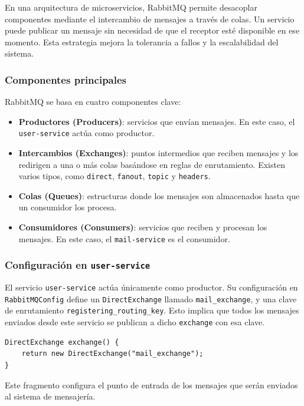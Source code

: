 En una arquitectura de microservicios, RabbitMQ permite desacoplar componentes mediante el intercambio de mensajes a través de colas. Un servicio puede publicar un mensaje sin necesidad de que el receptor esté disponible en ese momento. Esta estrategia mejora la tolerancia a fallos y la escalabilidad del sistema.

\subsubsection{Componentes principales}

RabbitMQ se basa en cuatro componentes clave:

\begin{itemize}
  \item \textbf{Productores (Producers)}: servicios que envían mensajes. En este caso, el \texttt{user-service} actúa como productor.
  \item \textbf{Intercambios (Exchanges)}: puntos intermedios que reciben mensajes y los redirigen a una o más colas basándose en reglas de enrutamiento. Existen varios tipos, como \texttt{direct}, \texttt{fanout}, \texttt{topic} y \texttt{headers}.
  \item \textbf{Colas (Queues)}: estructuras donde los mensajes son almacenados hasta que un consumidor los procesa.
  \item \textbf{Consumidores (Consumers)}: servicios que reciben y procesan los mensajes. En este caso, el \texttt{mail-service} es el consumidor.
\end{itemize}

\subsubsection{Configuración en \texttt{user-service}}

El servicio \texttt{user-service} actúa únicamente como productor. Su configuración en \texttt{RabbitMQConfig} define un \texttt{DirectExchange} llamado \texttt{mail\_exchange}, y una clave de enrutamiento \texttt{registering\_routing\_key}. Esto implica que todos los mensajes enviados desde este servicio se publican a dicho \texttt{exchange} con esa clave.

\begin{verbatim}
DirectExchange exchange() {
    return new DirectExchange("mail_exchange");
}
\end{verbatim}

Este fragmento configura el punto de entrada de los mensajes que serán enviados al sistema de mensajería.

